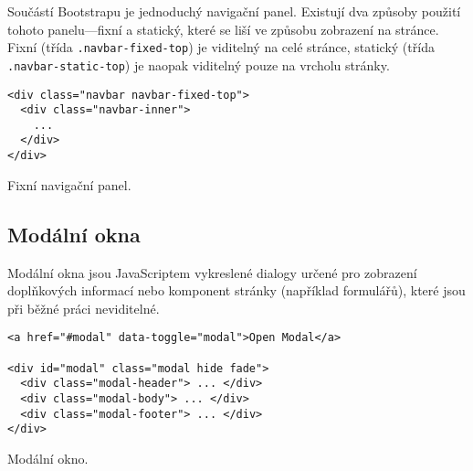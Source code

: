 Součástí Bootstrapu je jednoduchý navigační panel. Existují dva způsoby použití tohoto panelu---fixní a statický, které se liší ve způsobu zobrazení na stránce. Fixní (třída \texttt{.navbar-fixed-top}) je viditelný na celé stránce, statický (třída \texttt{.navbar-static-top}) je naopak viditelný pouze na vrcholu stránky.

\begin{example}
    \centering
    \begin{lstlisting}
<div class="navbar navbar-fixed-top">
  <div class="navbar-inner">
    ...
  </div>
</div>
    \end{lstlisting}
    \caption{Fixní navigační panel.}
    \label{example:form}
\end{example}

\subsection{Modální okna}

Modální okna jsou JavaScriptem vykreslené dialogy určené pro zobrazení doplňkových informací nebo komponent stránky (například formulářů), které jsou při běžné práci neviditelné.

\begin{example}
    \centering
    \begin{lstlisting}
<a href="#modal" data-toggle="modal">Open Modal</a>

<div id="modal" class="modal hide fade">
  <div class="modal-header"> ... </div>
  <div class="modal-body"> ... </div>
  <div class="modal-footer"> ... </div>
</div>
    \end{lstlisting}
    \caption{Modální okno.}
    \label{example:form}
\end{example}
